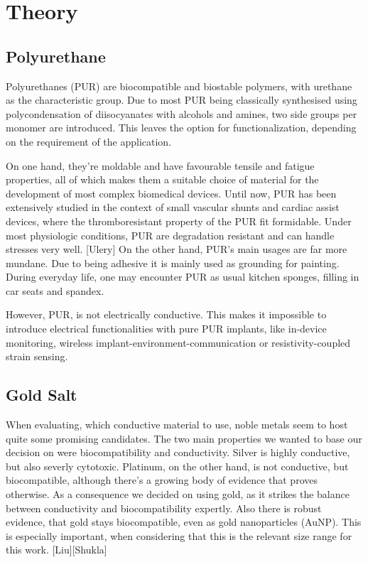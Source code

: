 \section{Theory}

\subsection{Polyurethane}

Polyurethanes (PUR) are biocompatible and biostable polymers, with urethane as the characteristic group. Due to most PUR being classically synthesised using polycondensation of diisocyanates with alcohols and amines, two side groups per monomer are introduced. This leaves the option for functionalization, depending on the requirement of the application. 

On one hand, they're moldable and have favourable tensile and fatigue properties, all of which makes them a suitable choice of material for the development of most complex biomedical devices. Until now, PUR has been extensively studied in the context of small vascular shunts and cardiac assist devices, where the thromboresistant property of the PUR fit formidable. Under most physiologic conditions, PUR are degradation resistant and can handle stresses very well. [Ulery] 
On the other hand, PUR's main usages are far more mundane. Due to being adhesive it is mainly used as grounding for painting. During everyday life, one may encounter PUR as usual kitchen sponges, filling in car seats and spandex.

However, PUR, is not electrically conductive. This makes it impossible to introduce electrical functionalities with pure PUR implants, like in-device monitoring, wireless implant-environment-communication or resistivity-coupled strain sensing.



\subsection{Gold Salt}

When evaluating, which conductive material to use, noble metals seem to host quite some promising candidates. The two main properties we wanted to base our decision on were biocompatibility and conductivity. Silver is highly conductive, but also severly cytotoxic. Platinum, on the other hand, is not conductive, but biocompatible, although there's a growing body of evidence that proves otherwise. As a consequence we decided on using gold, as it strikes the balance between conductivity and biocompatibility expertly. Also there is robust evidence, that gold stays biocompatible, even as gold nanoparticles (AuNP). This is especially important, when considering that this is the relevant size range for this work. [Liu][Shukla]

